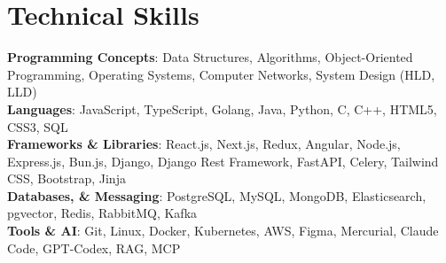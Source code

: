 \documentclass[letterpaper,11pt]{article}
\begin{document}
\section{Technical Skills}
 \begin{itemize}[leftmargin=0.15in, label={}]
    \small{\item{
     \textbf{Programming Concepts}{: Data Structures, Algorithms, Object-Oriented Programming, Operating Systems, Computer Networks, System Design (HLD, LLD)} \\
     \textbf{Languages}{: JavaScript, TypeScript, Golang, Java, Python, C, C++, HTML5, CSS3, SQL} \\
     \textbf{Frameworks \& Libraries}{: React.js, Next.js, Redux, Angular, Node.js, Express.js, Bun.js, Django, Django Rest Framework, FastAPI, Celery, Tailwind CSS, Bootstrap, Jinja} \\
     \textbf{Databases, \& Messaging}{: PostgreSQL, MySQL, MongoDB, Elasticsearch, pgvector, Redis, RabbitMQ, Kafka} \\
     \textbf{Tools \& AI}{: Git, Linux, Docker, Kubernetes, AWS, Figma, Mercurial, Claude Code, GPT-Codex, RAG, MCP}
    }}
 \end{itemize}


%

\end{document}
